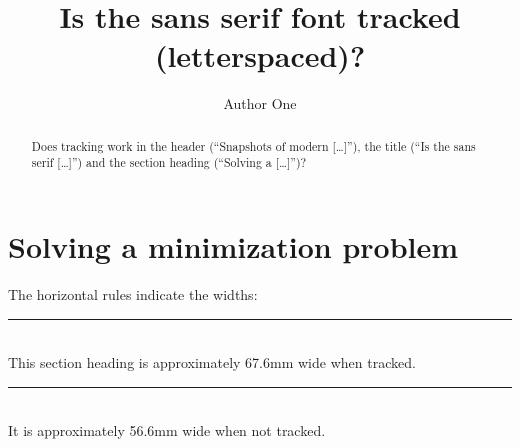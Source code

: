 \documentclass{snapshotmfo}
\author{Author One}
\title{Is the sans serif font tracked (letterspaced)?}
\begin{document}

\begin{abstract}
\texorpdfstring{Does tracking work in the header (``Snapshots of modern [\dots]''), the title (``Is the sans serif [\dots]'') and the section heading (``Solving a [\dots]'')?
}{Does tracking work in the header ("Snapshots of modern [...]"), the title ("Is the sans serif [...]") and the section heading ("Solving a [...]")?
}
\end{abstract}

\section{Solving a minimization problem}
The horizontal rules indicate the widths: \\
\rule{67.6mm}{2mm} \\
This section heading is approximately 67.6mm wide when tracked. \\
\rule{56.6mm}{2mm} \\
It is approximately 56.6mm wide when not tracked.
\end{document}

